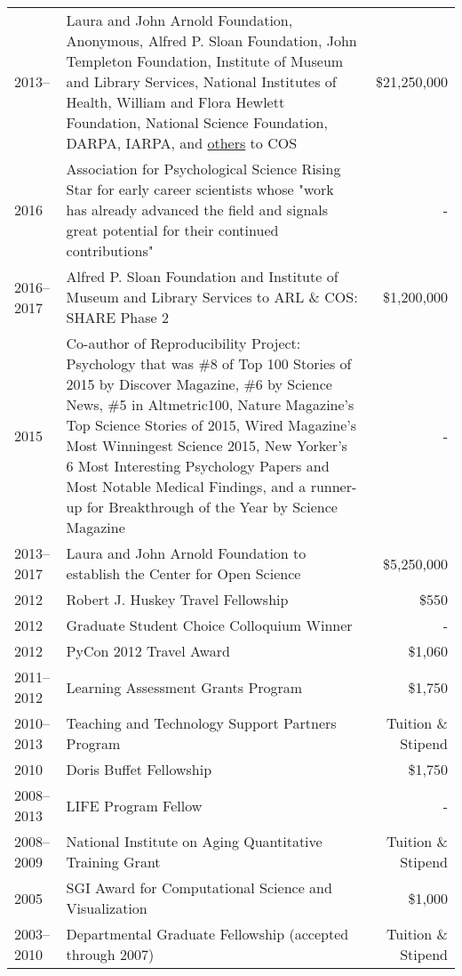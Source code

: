 \documentclass[11pt]{article}
\begin{document}
\begin{tabularx}{\textwidth}{lXr}
2013-- 			& Laura and John Arnold Foundation, Anonymous, Alfred P. Sloan Foundation, John Templeton Foundation, Institute of Museum and Library Services, National Institutes of Health, William and Flora Hewlett Foundation, National Science Foundation, DARPA, IARPA, and \href{https://cos.io/about/our-sponsors/}{others} to COS  & \$21,250,000 \\
2016				& Association for Psychological Science Rising Star for early career scientists whose "work has already advanced the field and signals great potential for their continued contributions" & - \\
2016--2017		& Alfred P. Sloan Foundation and Institute of Museum and Library Services to ARL \& COS: SHARE Phase 2 & \$1,200,000 \\
2015 				& Co-author of Reproducibility Project: Psychology that was \#8 of Top 100 Stories of 2015 by Discover Magazine, \#6 by Science News, \#5 in Altmetric100, Nature Magazine’s Top Science Stories of 2015,  Wired Magazine’s Most Winningest Science 2015, New Yorker’s 6 Most Interesting Psychology Papers and Most Notable Medical Findings, and a runner-up for Breakthrough of the Year by Science Magazine & - \\
2013--2017  	& Laura and John Arnold Foundation to establish the Center for Open Science & \$5,250,000 \\
2012        		& Robert J. Huskey Travel Fellowship  & \$550 \\
2012        		& Graduate Student Choice Colloquium Winner  & - \\
2012        		& PyCon 2012 Travel Award & \$1,060\\
2011--2012  	& Learning Assessment Grants Program & \$1,750\\
2010--2013		& Teaching and Technology Support Partners Program & Tuition \& Stipend \\
2010       		& Doris Buffet Fellowship & \$1,750 \\
2008--2013 	& LIFE Program Fellow & - \\
2008--2009  	& National Institute on Aging Quantitative Training Grant & Tuition \& Stipend \\
2005 				& SGI Award for Computational Science and Visualization & \$1,000 \\
2003--2010  	& Departmental Graduate Fellowship (accepted through 2007)  & Tuition \& Stipend \\
\end{tabularx}
\end{document}
